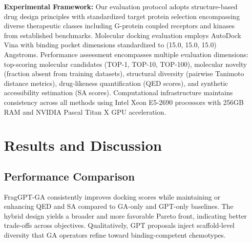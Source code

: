 \documentclass[lettersize,journal]{IEEEtran}
\begin{document}
\noindent \textbf{Experimental Framework:} Our evaluation protocol adopts structure-based drug design principles with standardized target protein selection encompassing diverse therapeutic classes including G-protein coupled receptors and kinases from established benchmarks. Molecular docking evaluation employs AutoDock Vina with binding pocket dimensions standardized to (15.0, 15.0, 15.0) Angstroms. Performance assessment encompasses multiple evaluation dimensions: top-scoring molecular candidates (TOP-1, TOP-10, TOP-100), molecular novelty (fraction absent from training datasets), structural diversity (pairwise Tanimoto distance metrics), drug-likeness quantification (QED scores), and synthetic accessibility estimation (SA scores). Computational infrastructure maintains consistency across all methods using Intel Xeon E5-2690 processors with 256GB RAM and NVIDIA Pascal Titan X GPU acceleration.


\section{Results and Discussion}
\subsection{Performance Comparison}
FragGPT-GA consistently improves docking scores while maintaining or enhancing QED and SA compared to GA-only and GPT-only baselines. The hybrid design yields a broader and more favorable Pareto front, indicating better trade-offs across objectives. Qualitatively, GPT proposals inject scaffold-level diversity that GA operators refine toward binding-competent chemotypes.
\end{document}
